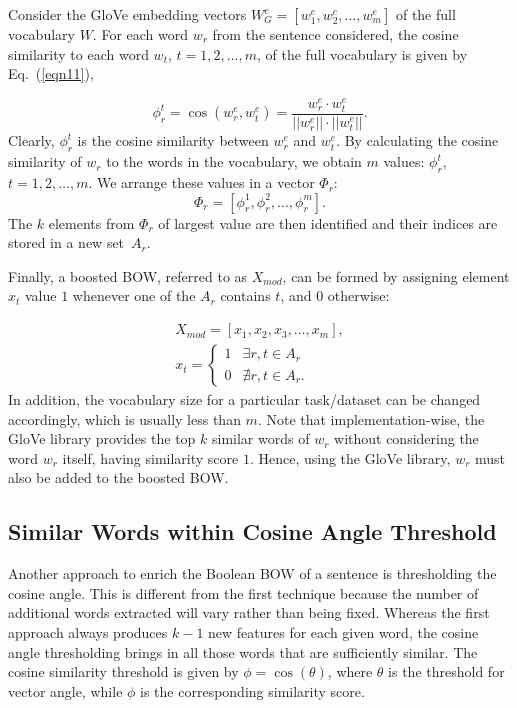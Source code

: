 \documentclass[11pt]{article}
\begin{document}
 Consider the GloVe embedding vectors $W_G^e = [w_1^e, w_2^e, \ldots, w_m^e]$ of the full vocabulary $W$. For each word $w_r$ from the sentence considered, the cosine similarity to each word $w_t$, $t = 1,2,\ldots, m$, of the full vocabulary is given by Eq.~(\ref{eqn11}),
 
{\small
\begin{equation}\label{eqn11}
\phi_r^t = \cos(w_r^{e}, w_t^e) = \frac{w_r^{e} \cdot w_t^e}{||w_r^{e}||\cdot ||w_t^e||}.
\end{equation}}
\noindent 
Clearly, \(\phi_r^t\) is the cosine similarity between \(w_r^{e}\) and \(w_t^e\).
By calculating the cosine similarity of $w_r$ to the words in the vocabulary, we obtain $m$ values: $\phi_r^t$, $t = 1,2,\ldots, m$. We arrange these values in a vector $\Phi_r$:
{\small\begin{equation}\label{eqn12}
\Phi_r = [\phi_r^1, \phi_r^2, \ldots, \phi_r^m ].
\end{equation}}
The $k$ elements from $\Phi_r$ of largest value are then identified and their indices are stored in a new set~$A_r$.

Finally, a boosted BOW, referred to as $X_{mod}$, can be formed by assigning element $x_t$ value $1$ whenever one of the $A_r$ contains $t$, and $0$ otherwise:

{\small\begin{eqnarray}\label{eqn13}
X_{mod} = [x_1, x_2, x_3, \ldots, x_m], \\
    x_t = \begin{cases}
    1 & \exists r, t \in A_r\\
    0 & \nexists r, t \in A_r.
    \end{cases}\nonumber
\end{eqnarray}}
In addition, the vocabulary size for a particular task/dataset can be changed accordingly, which is usually less than $m$.
Note that implementation-wise, the GloVe library provides the top $k$ similar words of $w_r$ without considering the word $w_r$ itself, having similarity score $1$. Hence, using the GloVe library, $w_r$  must also be added to the boosted BOW.

\subsection{Similar Words within Cosine Angle Threshold}
Another approach to enrich the Boolean BOW of a sentence  is thresholding the cosine angle. This is different from the first technique because the number of additional words extracted will vary rather than being fixed. Whereas the first approach always produces $k-1$ new features for each given word, the cosine angle thresholding brings in all those words that are sufficiently similar. The cosine similarity threshold is given by $\phi = \cos(\theta)$,
where $\theta$ is the threshold for vector angle, while $\phi$ is the corresponding similarity score.
\end{document}
